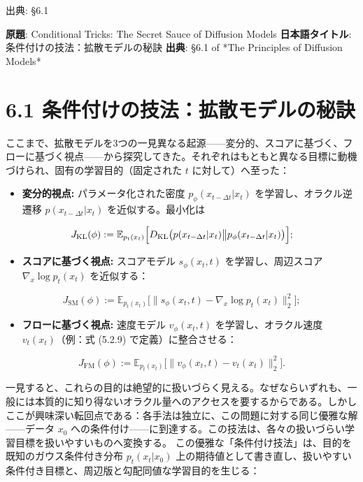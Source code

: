 

{\color{gray}\footnotesize 出典: §6.1\par}
\vspace{0.2em}
\begin{propositionbox}[原題]
\textbf{原題}: Conditional Tricks: The Secret Sauce of Diffusion Models
\textbf{日本語タイトル}: 条件付けの技法：拡散モデルの秘訣
\textbf{出典}: §6.1 of *The Principles of Diffusion Models*
\end{propositionbox}


\section*{6.1 条件付けの技法：拡散モデルの秘訣}


ここまで、拡散モデルを3つの一見異なる起源——変分的、スコアに基づく、フローに基づく視点——から探究してきた。それぞれはもともと異なる目標に動機づけられ、固有の学習目的（固定された $t$ に対して）へ至った：

\begin{itemize}
\item \textbf{変分的視点:} パラメータ化された密度 $p_\phi(x_{t-\Delta t}|x_t)$ を学習し、オラクル逆遷移 $p(x_{t-\Delta t}|x_t)$ を近似する。最小化は
\end{itemize}

\[
J_{\mathrm{KL}}(\phi) := \mathbb{E}_{p_t(x_t)}\Bigl[D_{\mathrm{KL}}\bigl(p(x_{t-\Delta t}|x_t)\big\|p_\phi(x_{t-\Delta t}|x_t)\bigr)\Bigr];
\]


\begin{itemize}
\item \textbf{スコアに基づく視点:} スコアモデル $s_\phi(x_t, t)$ を学習し、周辺スコア $\nabla_x\log p_t(x_t)$ を近似する：
\end{itemize}

\[
J_{\mathrm{SM}}(\phi) := \mathbb{E}_{p_t(x_t)}\bigl[\|s_\phi(x_t, t) - \nabla_x\log p_t(x_t)\|_2^2\bigr];
\]


\begin{itemize}
\item \textbf{フローに基づく視点:} 速度モデル $v_\phi(x_t, t)$ を学習し、オラクル速度 $v_t(x_t)$（例：式 (5.2.9) で定義）に整合させる：
\end{itemize}

\[
J_{\mathrm{FM}}(\phi) := \mathbb{E}_{p_t(x_t)}\bigl[\|v_\phi(x_t, t) - v_t(x_t)\|_2^2\bigr].
\]


一見すると、これらの目的は絶望的に扱いづらく見える。なぜならいずれも、一般には本質的に知り得ないオラクル量へのアクセスを要するからである。しかしここが興味深い転回点である：各手法は独立に、この問題に対する同じ優雅な解——データ $x_0$ への条件付け——に到達する。この技法は、各々の扱いづらい学習目標を扱いやすいものへ変換する。
この優雅な「条件付け技法」は、目的を既知のガウス条件付き分布 $p_t(x_t|x_0)$ 上の期待値として書き直し、扱いやすい条件付き目標と、周辺版と勾配同値な学習目的を生じる：

